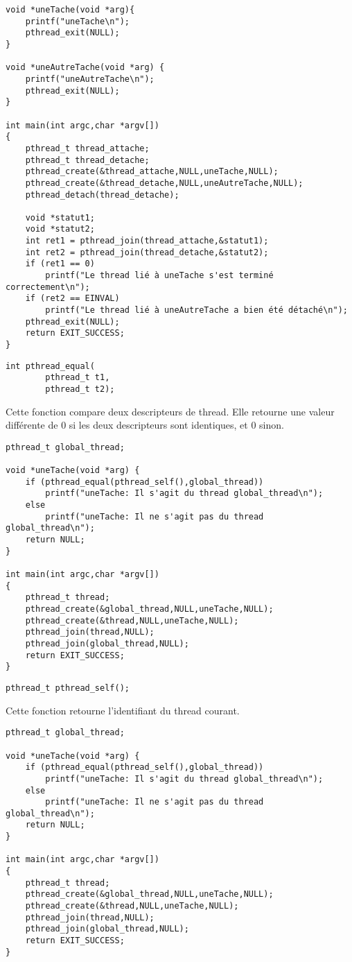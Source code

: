 \begin{lstlisting}
void *uneTache(void *arg){
	printf("uneTache\n");
	pthread_exit(NULL);
}

void *uneAutreTache(void *arg) {
	printf("uneAutreTache\n");
	pthread_exit(NULL);
}

int main(int argc,char *argv[])
{
	pthread_t thread_attache;
	pthread_t thread_detache;
	pthread_create(&thread_attache,NULL,uneTache,NULL);
	pthread_create(&thread_detache,NULL,uneAutreTache,NULL);
	pthread_detach(thread_detache);

	void *statut1;
	void *statut2;
	int ret1 = pthread_join(thread_attache,&statut1);
	int ret2 = pthread_join(thread_detache,&statut2);
	if (ret1 == 0)
		printf("Le thread lié à uneTache s'est terminé correctement\n");
	if (ret2 == EINVAL)
		printf("Le thread lié à uneAutreTache a bien été détaché\n");
	pthread_exit(NULL);
	return EXIT_SUCCESS;
}
\end{lstlisting}


\label{func:pthread_equal}

\begin{lstlisting}
int pthread_equal(
		pthread_t t1,
		pthread_t t2);
\end{lstlisting}
Cette fonction compare deux descripteurs de thread. Elle retourne une valeur différente de 0 si les deux descripteurs sont identiques, et 0 sinon.

\begin{lstlisting}
pthread_t global_thread;

void *uneTache(void *arg) {
	if (pthread_equal(pthread_self(),global_thread))
		printf("uneTache: Il s'agit du thread global_thread\n");
	else
		printf("uneTache: Il ne s'agit pas du thread global_thread\n");
	return NULL;
}

int main(int argc,char *argv[])
{
	pthread_t thread;
	pthread_create(&global_thread,NULL,uneTache,NULL);
	pthread_create(&thread,NULL,uneTache,NULL);
	pthread_join(thread,NULL);
	pthread_join(global_thread,NULL);
	return EXIT_SUCCESS;
}
\end{lstlisting}

\label{func:pthread_self}

\begin{lstlisting}
pthread_t pthread_self();
\end{lstlisting}
Cette fonction retourne l'identifiant du thread courant.
\begin{lstlisting}
pthread_t global_thread;

void *uneTache(void *arg) {
	if (pthread_equal(pthread_self(),global_thread))
		printf("uneTache: Il s'agit du thread global_thread\n");
	else
		printf("uneTache: Il ne s'agit pas du thread global_thread\n");
	return NULL;
}

int main(int argc,char *argv[])
{
	pthread_t thread;
	pthread_create(&global_thread,NULL,uneTache,NULL);
	pthread_create(&thread,NULL,uneTache,NULL);
	pthread_join(thread,NULL);
	pthread_join(global_thread,NULL);
	return EXIT_SUCCESS;
}
\end{lstlisting}


